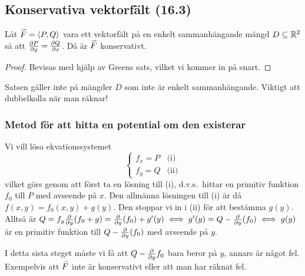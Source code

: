 \documentclass[a4paper]{article}
\begin{document}
\providecommand\fname{}
\renewcommand\fname{19-10-08}

\subsection{Konservativa vektorfält (16.3)}
\begin{sats}
    Låt \(
        \accentset{\rightharpoonup}{F} = \left\langle P, Q \right\rangle 
    \) vara ett vektorfält på en enkelt sammanhängande mängd \(
        D \subseteq \mathbb{R}^2
    \) så att \(
        \pdv{P}{y} = \pdv{Q}{x}
    \). Då är \(
        \accentset{\rightharpoonup}{F} 
    \) konservativt.

    \begin{proof}
        Bevisas med hjälp av Greens sats, vilket vi kommer in på snart.
    \end{proof}
\end{sats}

\begin{anm}
    Satsen gäller inte på mängder \(
        D
    \) som inte är enkelt sammanhängande. Viktigt att dubbelkolla när man räknar!
\end{anm}

\subsubsection{Metod för att hitta en potential om den existerar}
Vi vill lösa ekvationssystemet \[
    \left\{\begin{matrix}
        f_x = P & \text{(i)} \\ 
        f_y = Q & \text{(ii)} 
    \end{matrix}\right.
\] vilket görs genom att först ta en lösning till (i), d.v.s.\ 
hittar en primitiv funktion \(
    f_0
\) till \(
    P
\) med avseende på \(
    x
\). Den allmänna lösningen till (i) är då \(
    f(x,y) = f_0(x,y) + g(y)
\). Den stoppar vi in i (ii) för att bestämma \(
    g(y)
\). Alltså är \(
    Q = f_y \pdv{y}(f_0+g) = \pdv{y}(f_0) + g'(y) 
        \iff g'(y) = Q - \pdv{y}(f_0) 
        \iff g(y)
\) är en primitiv funktion till \(
    Q - \pdv{y}(f_0)
\) med avseende på \(
    y
\). 

\begin{obs}
    I detta sista steget måste vi få att \(
        Q - \pdv{y} f_0 
    \) bara beror på \(
        y
    \), annars är något fel. Exempelvis att \(
        \accentset{\rightharpoonup}{F} 
    \) inte är konservativt eller att man har räknat fel.
\end{obs}
\end{document}
